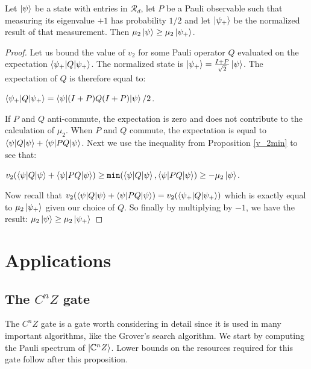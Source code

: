 \documentclass[12pt]{dalthesis}
\begin{document}
\begin{proposition}
\label{dyadic is monotone}
Let $\ket{\psi}$ be a state with entries in $\mathcal{R}_d$, let $P$ be a Pauli observable such that measuring its eigenvalue $+1$ has probability $1/2$ and let $\ket{\psi_+}$ be the normalized result of that measurement. Then $\mu_2\ket{\psi} \geq \mu_2\ket{\psi_+}$. 
\end{proposition}
\begin{proof}
Let us bound the value of $v_2$ for some Pauli operator $Q$ evaluated on the expectation $\braket{\psi_+ | Q |\psi_+}$. The normalized state is $\ket{\psi_+} = \frac{I + P}{\sqrt{2}}\ket{\psi}$. The expectation of $Q$ is therefore equal to:
\begin{center}
$\braket{\psi_+ | Q |\psi_+} = \braket{\psi | (I + P)Q(I + P) | \psi}/2$.
\end{center}
If $P$ and $Q$ anti-commute, the expectation is zero and does not contribute to the calculation of $\mu_2$. When $P$ and $Q$ commute, the expectation is equal to $\braket{\psi | Q | \psi} + \braket{\psi |PQ |\psi}$. Next we use the inequality from Proposition \ref{v_2min} to see that:
\begin{center}
$v_2(\braket{\psi |Q| \psi} + \braket{\psi |PQ| \psi}) \geq \texttt{min}(\braket{\psi |Q|\psi}, \braket{\psi |PQ|\psi}) \geq -\mu_2\ket{\psi}$.
\end{center}
Now recall that $v_2(\braket{\psi |Q| \psi} + \braket{\psi |PQ| \psi}) = v_2(\braket{\psi_+ |Q| \psi_+})$ which is exactly equal to $\mu_2\ket{\psi_+}$ given our choice of $Q$. So finally by multiplying by $-1$, we have the result: $\mu_2\ket{\psi} \geq \mu_2\ket{\psi_+}$
\end{proof}

\chapter{Applications}
\label{Applications}

\section{The \texorpdfstring{$C^nZ$}{CnZ} gate}

The $C^n Z$ gate is a gate worth considering in detail since it is used in many important algorithms, like the Grover's search algorithm. We start by computing the Pauli spectrum of $\ket{\mathbb{C}^nZ}$. Lower bounds on the resources required for this gate follow after this proposition.
\end{document}
